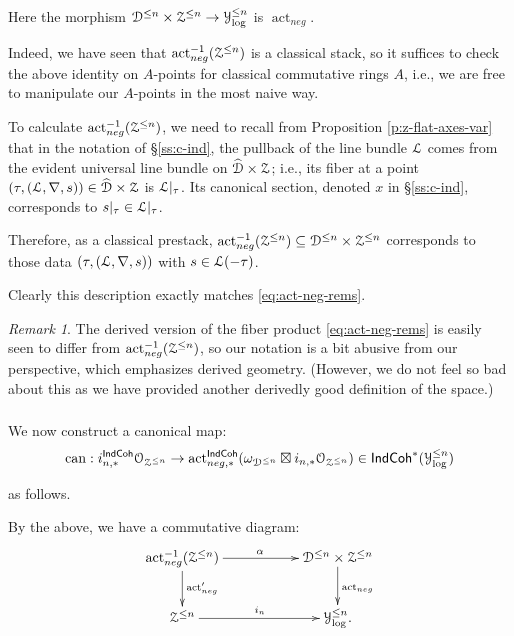 \documentclass[reqno,11pt]{amsart}
\numberwithin{equation}{subsection}
\theoremstyle{remark}
\newtheorem{rem}[thm]{Remark}
\newcommand{\sD}{{\EuScript D}}
\newcommand{\sL}{{\EuScript L}}
\newcommand{\sO}{{\EuScript O}}
\newcommand{\sY}{{\EuScript Y}}
\newcommand{\sZ}{{\EuScript Z}}
\newcommand{\on}{\operatorname}
\newcommand{\act}{\on{act}}
\newcommand{\IndCoh}{\mathsf{IndCoh}}
\renewcommand{\subset}{\subseteq}
\begin{document}
\noindent Here the morphism 
$\sD^{\leq n} \times \sZ^{\leq n} \to \sY_{\log}^{\leq n}$
is $\act_{neg}$.

Indeed, we have seen that 
$\act_{neg}^{-1}(\sZ^{\leq n})$
is a classical stack, so it suffices to check
the above identity on $A$-points for classical
commutative rings $A$, i.e., we are free to 
manipulate our $A$-points in the most naive way.

To calculate $\act_{neg}^{-1}(\sZ^{\leq n})$,
we need to recall from 
Proposition \ref{p:z-flat-axes-var} that
in the notation of \S \ref{ss:c-ind}, the
pullback of the line bundle $\sL$ comes from
the evident universal line bundle
on $\widehat{\sD} \times \sZ$; i.e.,
its fiber at a point 
$(\tau,(\sL,\nabla,s)) \in \widehat{\sD} \times \sZ$ 
is $\sL|_{\tau}$. Its canonical section,
denoted $x$ in \S \ref{ss:c-ind}, corresponds
to $s|_{\tau} \in \sL|_{\tau}$. 

Therefore, as a classical prestack,
$\act_{neg}^{-1}(\sZ^{\leq n}) \subset 
\sD^{\leq n} \times \sZ^{\leq n}$
corresponds to those data
$(\tau,(\sL,\nabla,s))$ with $s \in \sL(-\tau)$.

Clearly this description exactly matches
\eqref{eq:act-neg-rems}.

\begin{rem}

The derived version of the
fiber product \eqref{eq:act-neg-rems} is easily
seen to differ from 
$\act_{neg}^{-1}(\sZ^{\leq n})$, so our notation
is a bit abusive from our perspective, which
emphasizes derived geometry. (However, we do
not feel so bad about this as we have provided
another derivedly good definition of the space.)

\end{rem}

\subsubsection{}\label{ss:can-constr}

We now construct a canonical map:
%
\[
\on{can}:
i_{n,*}^{\IndCoh}\sO_{\sZ^{\leq n}} \to 
\act_{neg,*}^{\IndCoh}
(\omega_{\sD^{\leq n}} \boxtimes 
i_{n,*}\sO_{\sZ^{\leq n}}) \in 
\IndCoh^*(\sY_{\log}^{\leq n})
\]

\noindent as follows. 

By the above, we have a commutative diagram:
%
\[
\xymatrix{
\act_{neg}^{-1}(\sZ^{\leq n}) \ar[d]^{\act_{neg}^{\prime}} 
\ar[rr]^{\alpha} && 
\sD^{\leq n} \times \sZ^{\leq n} \ar[d]^{\act_{neg}} \\ 
\sZ^{\leq n} \ar[rr]^{i_n} && \sY_{\log}^{\leq n}.
}
\]
\end{document}
